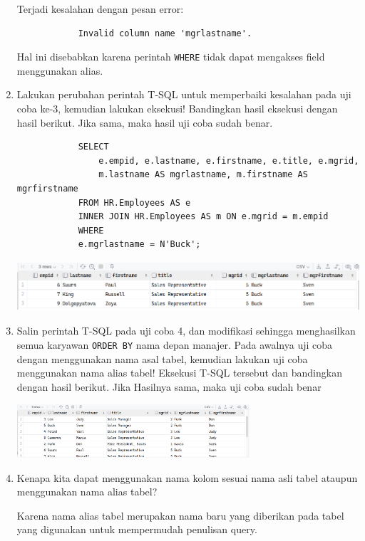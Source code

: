 \documentclass[12pt,titlepage]{article}
\begin{document}
\begin{enumerate}
{        Terjadi kesalahan dengan pesan error:

        \begin{verbatim}
            Invalid column name 'mgrlastname'.
        \end{verbatim}

        Hal ini disebabkan karena perintah \texttt{WHERE} tidak dapat mengakses field menggunakan alias.
    }
    \item {
        Lakukan perubahan perintah T-SQL untuk memperbaiki kesalahan pada uji coba ke-3,
        kemudian lakukan eksekusi! Bandingkan hasil eksekusi dengan hasil berikut. Jika sama, maka
        hasil uji coba sudah benar.

        \begin{verbatim}
            SELECT
                e.empid, e.lastname, e.firstname, e.title, e.mgrid,
                m.lastname AS mgrlastname, m.firstname AS mgrfirstname
            FROM HR.Employees AS e
            INNER JOIN HR.Employees AS m ON e.mgrid = m.empid
            WHERE
            e.mgrlastname = N'Buck';
        \end{verbatim}

        \begin{center}
            \includegraphics[height=1.85cm]{./images/p6-n3.png}
        \end{center}
    }
    \item {
        Salin perintah T-SQL pada uji coba 4, dan modifikasi sehingga menghasilkan semua
        karyawan \texttt{ORDER BY} nama depan manajer. Pada awalnya uji coba dengan menggunakan nama
        asal tabel, kemudian lakukan uji coba menggunakan nama alias tabel! Eksekusi T-SQL tersebut
        dan bandingkan dengan hasil berikut. Jika Hasilnya sama, maka uji coba sudah benar

        \begin{center}
            \includegraphics[height=2cm]{./images/p6-n4.png}
        \end{center}
    }
    \item {
        Kenapa kita dapat menggunakan nama kolom sesuai nama asli tabel ataupun
        menggunakan nama alias tabel?

        Karena nama alias tabel merupakan nama baru yang diberikan pada tabel yang digunakan untuk mempermudah
        penulisan query.
    }
\end{enumerate}
\end{document}
